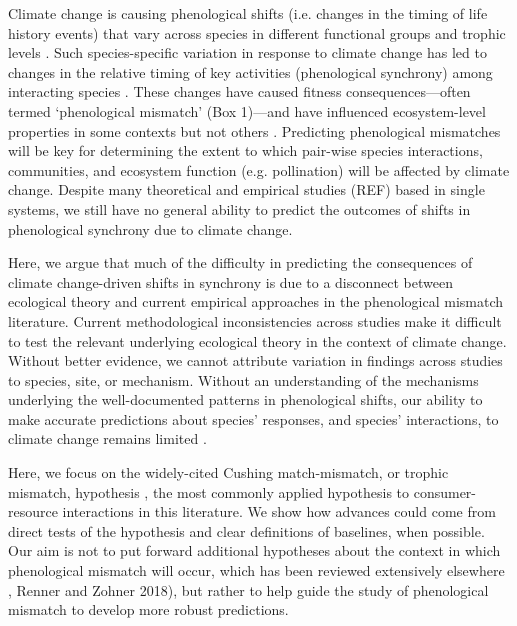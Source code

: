 \documentclass[11pt,letterpaper]{article}
\begin{document}
Climate change is causing phenological shifts (i.e. changes in the timing of life history events) that vary across species in different functional groups and trophic levels \citep{ovaskainen2013,caradonna2014, thackeray2016}. Such species-specific variation in response to climate change has led to changes in the relative timing of key activities (phenological synchrony) among interacting species \citep{kharouba2018}. These changes have caused fitness consequences—often termed ‘phenological mismatch’ (Box 1)—and have influenced ecosystem-level properties in some contexts \citep{post2007, burkle2013, plard2014, doiron2015} but not others \citep{vatka2011, burthe2012}. Predicting phenological mismatches will be key for determining the extent to which pair-wise species interactions, communities, and ecosystem function (e.g. pollination) will be affected by climate change. Despite many theoretical \citep{johansson2015,bewick2016} and empirical studies (REF) based in single systems, we still have no general ability to predict the outcomes of shifts in phenological synchrony due to climate change.  \par

Here, we argue that much of the difficulty in predicting the consequences of climate change-driven shifts in synchrony is due to a disconnect between ecological theory and current empirical approaches in the phenological mismatch literature. Current methodological inconsistencies across studies make it difficult to test the relevant underlying ecological theory in the context of climate change. Without better evidence, we cannot attribute variation in findings across studies to species, site, or mechanism. Without an understanding of the mechanisms underlying the well-documented patterns in phenological shifts, our ability to make accurate predictions about species’ responses, and species’ interactions, to climate change remains limited \citep{oconnor2012, chmura2018}. \par

Here, we focus on the widely-cited Cushing match-mismatch, or trophic mismatch, hypothesis \citeyearpar{cushing1974}, the most commonly applied hypothesis to consumer-resource interactions in this literature. We show how advances could come from direct tests of the hypothesis and clear definitions of baselines, when possible. Our aim is not to put forward additional hypotheses about the context in which phenological mismatch will occur, which has been reviewed extensively elsewhere \citep[e.g.,][] {millerrushing2010}, Renner and Zohner 2018), but rather to help guide the study of phenological mismatch to develop more robust predictions.  \par
\end{document}
